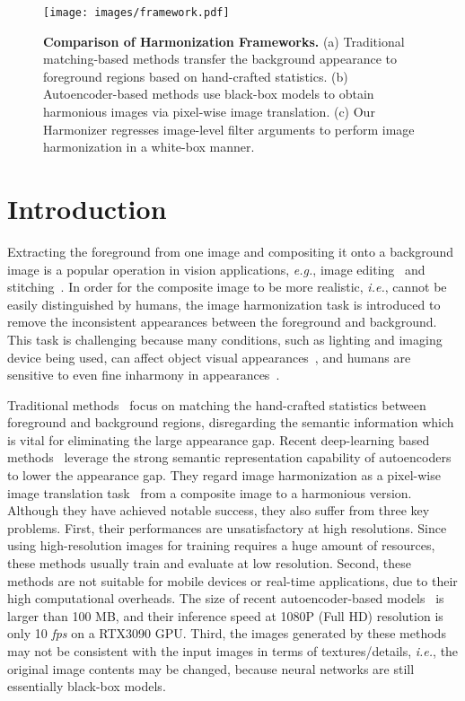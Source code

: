 \documentclass[runningheads]{llncs}
\newcommand{\ke}[1]{{\color{black}#1}}
\begin{document}
 \begin{figure}[t]
\centering
\texttt{[image: images/framework.pdf]}
{\begin{center}
\vspace{-0.5cm}
\caption{\textbf{Comparison of Harmonization Frameworks.} (a) Traditional matching-based methods transfer the background appearance to foreground regions based on hand-crafted statistics. (b) Autoencoder-based methods use black-box models to obtain harmonious images via pixel-wise image translation. (c) Our Harmonizer regresses image-level filter arguments to perform image harmonization in a white-box manner.}
\label{fig:framework}
\end{center}
}
\vspace{-0.9cm}
\end{figure}

\section{Introduction}
Extracting the foreground from one image and compositing it onto a background image is a popular operation in vision applications, \textit{e.g.}, image editing~\cite{IHGD2,PatchMatch} and stitching~\cite{ImageStitching1,ImageStitching2}. In order for the composite image to be more realistic, {\it i.e.}, cannot be easily distinguished by humans, the image harmonization task is introduced to remove the \ke{inconsistent} appearances between the foreground and background. This task is challenging because many conditions, such as lighting and imaging device being used, can affect object visual appearances~\cite{SFS,SIRS}, and humans are sensitive to even fine inharmony in appearances~\cite{IHHV1,IHCD4}. 

Traditional methods~\cite{Zhu_2015_ICCV,IHCD1,IHCT1,IHGD1,IHHV1,IHMS1,DPH} focus on matching the hand-crafted statistics between foreground and background regions, disregarding the semantic information which is vital for eliminating the large appearance gap. Recent deep-learning based methods~\cite{DIH,DoveNet,IHADFM,TVH,FASRIH,SSH,TransformerIH} leverage the strong semantic representation capability of autoencoders~\cite{UNet} to lower the appearance gap.
They regard image harmonization as a pixel-wise image translation task~\cite{pix2pix,pix2pixHD} from a \ke{composite} image to a harmonious version. Although they have achieved notable success, they also suffer from three key problems. 
First, their performances are unsatisfactory at high resolutions. Since using high-resolution images for training requires a huge amount of resources, these methods usually train and evaluate at low resolution.
Second, these methods are not suitable for mobile devices or real-time applications, due to their high computational overheads. The size of recent  autoencoder-based models~\cite{DoveNet,RAIN,BargainNet,IntrinsicIH} is larger than 100 MB, and their inference speed at 1080P (Full HD) resolution is only 10 {\it fps} on a RTX3090 GPU.  
Third, the images generated by these methods may not be consistent with the input images in terms of textures/details, {\it i.e.}, the original image contents may be changed, because neural networks are still essentially black-box
models. 
\end{document}
